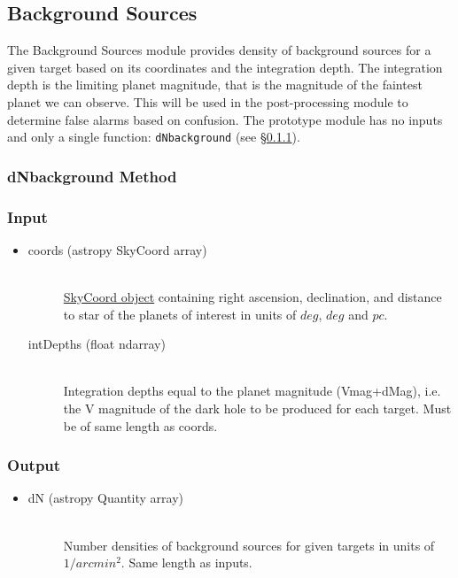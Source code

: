 \documentclass[cleanfoot]{asme2ej}
\begin{document}

\subsection{Background Sources}\label{sec:backgroundsources}

The Background Sources module provides density of background sources for a given target based on its coordinates and the integration depth. The integration depth is the limiting planet magnitude, that is the magnitude of the faintest planet we can observe. This will be used in the post-processing module to determine false alarms based on confusion.  The prototype module has no inputs and only a single function: \verb+dNbackground+ (see \S\ref{sec:dNbackgroundtask}).

\subsubsection{dNbackground Method} \label{sec:dNbackgroundtask}

\subsubsection*{Input}
\begin{itemize}
\item 
\begin{description}
    \item[coords (astropy SkyCoord array)] \hfill \\ \href{http://astropy.readthedocs.org/en/latest/api/astropy.coordinates.SkyCoord.html}{SkyCoord object} containing right ascension, declination, and  distance to star of the planets of interest in units of $ deg $, $ deg $ and $ pc $.
    \item[intDepths (float ndarray)] \hfill \\ Integration depths equal to the planet magnitude (Vmag+dMag), i.e. the V magnitude of the dark hole to be produced for each target. Must be of same length as coords.
\end{description}
\end{itemize}

\subsubsection*{Output}
\begin{itemize}
\item 
\begin{description}
    \item[dN (astropy Quantity array)] \hfill \\ Number densities of background sources for given targets in  units of $ 1/arcmin^2 $. Same length as inputs.
\end{description}
\end{itemize}
\end{document}
